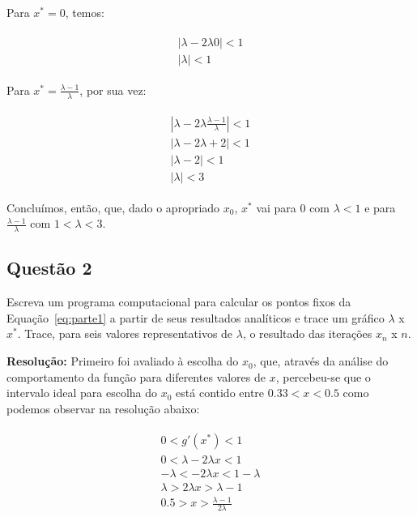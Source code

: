 \documentclass[12pt]{article}
\begin{document}
Para $x^{*} = 0$, temos:

\begin{eqnarray}
    \begin{split}
        \left| \lambda - 2 \lambda 0 \right| < 1 \\
        \left| \lambda\right| < 1
    \end{split}
\end{eqnarray}

Para $x^{*} = \frac{\lambda - 1}{\lambda}$, por sua vez:

\begin{eqnarray}
    \begin{split}
        \left| \lambda - 2 \lambda \frac{\lambda - 1}{\lambda} \right| < 1 \\
        \left| \lambda - 2 \lambda + 2 \right| < 1 \\
        \left| \lambda - 2 \right| < 1  \\
        \left| \lambda \right| < 3
    \end{split}
\end{eqnarray}

Concluímos, então, que, dado o apropriado $x_{0}$, ${x^{*}}$ vai para 0 com $\lambda < 1$ e para $\frac{\lambda-1}{\lambda}$ com $1 < \lambda < 3$.

\subsection*{Questão 2}
\label{sec:p1q2}
Escreva um programa computacional para calcular os pontos fixos da Equação~\ref{eq:parte1} a partir de seus resultados analíticos e trace um gráfico $\lambda$ x $x^{*}$. Trace, para seis valores representativos de $\lambda$, o resultado das iterações $x_{n}$ x $n$.

\textbf{Resolução:}
Primeiro foi avaliado à escolha do $x_{0}$, que, através da análise do comportamento da função para diferentes valores de $x$, percebeu-se que o intervalo ideal para escolha do $x_{0}$ está contido entre $0.33 < x < 0.5$ como podemos observar na resolução abaixo:

\begin{eqnarray}
    \begin{split}
        0 < g'(x^{*}) < 1 \\
        0 < \lambda - 2 \lambda x < 1 \\
        - \lambda < - 2 \lambda x < 1 - \lambda \\
        \lambda > 2 \lambda x > \lambda - 1 \\
        0.5 > x >  \frac{\lambda - 1}{2 \lambda}
    \end{split}
\end{eqnarray}
\end{document}
